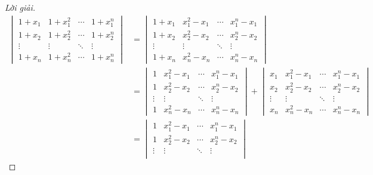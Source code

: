 \documentclass[class=nhvh-linear-algebra,crop=false]{standalone}
\begin{document}
\begin{proof}[Lời giải]
	\begingroup{}
	\allowdisplaybreaks{}
	\begin{align*}
		\begin{vmatrix}
			1 + x_{1} & 1 + x_{1}^{2} & \cdots & 1 + x_{1}^{n} \\
			1 + x_{2} & 1 + x_{2}^{2} & \cdots & 1 + x_{2}^{n} \\
			\vdots    & \vdots        & \ddots & \vdots        \\
			1 + x_{n} & 1 + x_{n}^{2} & \cdots & 1 + x_{n}^{n}
		\end{vmatrix}
		 & =
		\begin{vmatrix}
			1 + x_{1} & x_{1}^{2} - x_{1} & \cdots & x_{1}^{n} - x_{1} \\
			1 + x_{2} & x_{2}^{2} - x_{2} & \cdots & x_{2}^{n} - x_{2} \\
			\vdots    & \vdots            & \ddots & \vdots            \\
			1 + x_{n} & x_{n}^{2} - x_{n} & \cdots & x_{n}^{n} - x_{n}
		\end{vmatrix}                                   \\
		 & =
		\begin{vmatrix}
			1      & x_{1}^{2} - x_{1} & \cdots & x_{1}^{n} - x_{1} \\
			1      & x_{2}^{2} - x_{2} & \cdots & x_{2}^{n} - x_{2} \\
			\vdots & \vdots            & \ddots & \vdots            \\
			1      & x_{n}^{2} - x_{n} & \cdots & x_{n}^{n} - x_{n}
		\end{vmatrix}
		+
		\begin{vmatrix}
			x_{1}  & x_{1}^{2} - x_{1} & \cdots & x_{1}^{n} - x_{1} \\
			x_{2}  & x_{2}^{2} - x_{2} & \cdots & x_{2}^{n} - x_{2} \\
			\vdots & \vdots            & \ddots & \vdots            \\
			x_{n}  & x_{n}^{2} - x_{n} & \cdots & x_{n}^{n} - x_{n}
		\end{vmatrix}                                      \\
		 & =
		\begin{vmatrix}
			1      & x_{1}^{2} - x_{1} & \cdots & x_{1}^{n} - x_{1} \\
			1      & x_{2}^{2} - x_{2} & \cdots & x_{2}^{n} - x_{2} \\
			\vdots & \vdots            & \ddots & \vdots            \\

\end{vmatrix}
\end{align*}
\end{proof}
\end{document}
